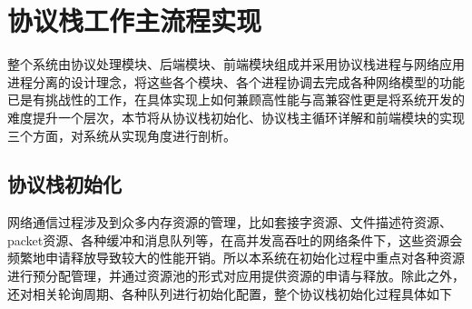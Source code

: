 \section{协议栈工作主流程实现}

整个系统由协议处理模块、后端模块、前端模块组成并采用协议栈进程与网络应用进程分离的设计理念，将这些各个模块、各个进程协调去完成各种网络模型的功能已是有挑战性的工作，在具体实现上如何兼顾高性能与高兼容性更是将系统开发的难度提升一个层次，本节将从协议栈初始化、协议栈主循环详解和前端模块的实现三个方面，对系统从实现角度进行剖析。

\subsection{协议栈初始化}
网络通信过程涉及到众多内存资源的管理，比如套接字资源、文件描述符资源、packet资源、各种缓冲和消息队列等，在高并发高吞吐的网络条件下，这些资源会频繁地申请释放导致较大的性能开销。所以本系统在初始化过程中重点对各种资源进行预分配管理，并通过资源池的形式对应用提供资源的申请与释放。除此之外，还对相关轮询周期、各种队列进行初始化配置，整个协议栈初始化过程具体如下
